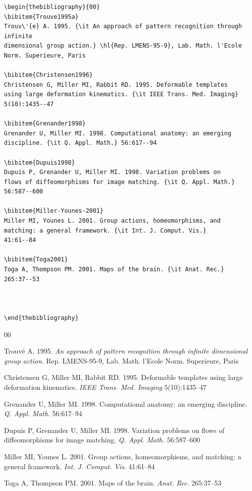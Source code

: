 \documentclass{ar-1col}
\begin{document}
\begin{verbatim}
\begin{thebibliography}{00}
\bibitem{Trouve1995a}
Trouv\'{e} A. 1995. {\it An approach of pattern recognition through infinite 
dimensional group action.} \hl{Rep. LMENS-95-9}, Lab. Math. l'Ecole Norm. Superieure, Paris 

\bibitem{Christensen1996}
Christensen G, Miller MI, Rabbit RD. 1995. Deformable templates
using large deformation kinematics. {\it IEEE Trans. Med. Imaging}
5(10):1435--47

\bibitem{Grenander1998}
Grenander U, Miller MI. 1998. Computational anatomy: an emerging
discipline. {\it Q. Appl. Math.} 56:617--94

\bibitem{Dupuis1998}
Dupuis P, Grenander U, Miller MI. 1998. Variation problems on
flows of diffeomorphisms for image matching. {\it Q. Appl. Math.}
56:587--600

\bibitem{Miller-Younes-2001}
Miller MI, Younes L. 2001. Group actions, homeomorphisms, and matching: a general framework. {\it Int. J. Comput. Vis.}
41:61--84

\bibitem{Toga2001}
Toga A, Thompson PM. 2001. Maps of the brain. {\it Anat. Rec.}
265:37--53



\end{thebibliography}
\end{verbatim}




\begin{thebibliography}{00}

Trouv\'{e} A. 1995. {\it An approach of pattern recognition through
infinite dimensional group action.} {Rep. LMENS-95-9}, Lab. Math. l'Ecole Norm. Superieure, Paris  

Christensen G, Miller MI, Rabbit RD. 1995. Deformable templates
using large deformation kinematics. {\it IEEE Trans. Med. Imaging}
5(10):1435--47

Grenander U, Miller MI. 1998. Computational anatomy: an emerging
discipline. {\it Q. Appl. Math.} 56:617--94

Dupuis P, Grenander U, Miller MI. 1998. Variation problems on
flows of diffeomorphisms for image matching. {\it Q. Appl. Math.}
56:587--600

Miller MI, Younes L. 2001. Group actions, homeomorphisms, and matching: a general framework. {\it Int. J. Comput. Vis.}
41:61--84

Toga A, Thompson PM. 2001. Maps of the brain. {\it Anat. Rec.}
265:37--53



 

\end{thebibliography}
\end{document}
